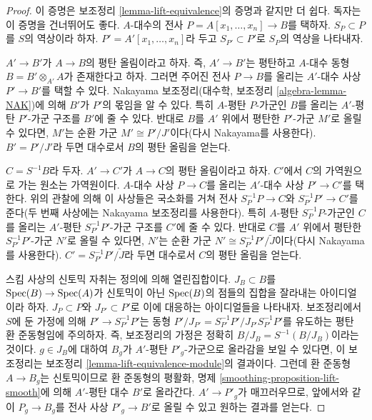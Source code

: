 \begin{proof}
이 증명은 보조정리 \ref{lemma-lift-equivalence}의 증명과 같지만 더 쉽다.
독자는 이 증명을 건너뛰어도 좋다. $A$-대수의 전사
$P = A[x_1, \ldots, x_n] \to B$를 택하자. $S_P \subset P$를 $S$의
역상이라 하자. $P' = A'[x_1, \ldots, x_n]$라 두고
$S_{P'} \subset P'$로 $S_P$의 역상을 나타내자.

\medskip\noindent
$A' \to B'$가 $A \to B$의 평탄 올림이라고 하자. 즉,
$A' \to B'$는 평탄하고 $A$-대수 동형 $B = B' \otimes_{A'} A$가
존재한다고 하자. 그러면 주어진 전사 $P \to B$를 올리는 $A'$-대수
사상 $P' \to B'$를 택할 수 있다. Nakayama 보조정리(대수학, 보조정리
\ref{algebra-lemma-NAK})에 의해 $B'$가 $P'$의 몫임을 알 수 있다.
특히 $A$-평탄 $P$-가군인 $B$를 올리는 $A'$-평탄 $P'$-가군 구조를
$B'$에 줄 수 있다. 반대로 $B$를 $A'$ 위에서 평탄한 $P'$-가군 $M'$로
올릴 수 있다면, $M'$는 순환 가군 $M' \cong P'/J'$이다(다시 Nakayama를
사용한다). $B' = P'/J'$라 두면 대수로서 $B$의 평탄 올림을 얻는다.

\medskip\noindent
$C = S^{-1}B$라 두자. $A' \to C'$가 $A \to C$의 평탄 올림이라고 하자.
$C'$에서 $C$의 가역원으로 가는 원소는 가역원이다. $A$-대수 사상
$P \to C$를 올리는 $A'$-대수 사상 $P' \to C'$를 택한다. 위의 관찰에
의해 이 사상들은 국소화를 거쳐 전사 $S_P^{-1}P \to C$와
$S_{P'}^{-1}P' \to C'$를 준다(두 번째 사상에는 Nakayama 보조정리를
사용한다). 특히 $A$-평탄 $S_P^{-1}P$-가군인 $C$를 올리는 $A'$-평탄
$S_{P'}^{-1}P'$-가군 구조를 $C'$에 줄 수 있다. 반대로 $C$를 $A'$ 위에서
평탄한 $S_{P'}^{-1}P'$-가군 $N'$로 올릴 수 있다면, $N'$는 순환 가군
$N' \cong S_{P'}^{-1}P'/\tilde J$이다(다시 Nakayama를 사용한다).
$C' = S_{P'}^{-1}P'/\tilde J$라 두면 대수로서 $C$의 평탄 올림을 얻는다.

\medskip\noindent
스킴 사상의 신토믹 자취는 정의에 의해 열린집합이다.
$J_B \subset B$를 $\mathop{\mathrm{Spec}}(B) \to \mathop{\mathrm{Spec}}(A)$가 신토믹이 아닌
$\mathop{\mathrm{Spec}}(B)$의 점들의 집합을 잘라내는 아이디얼이라 하자.
$J_P \subset P$와 $J_{P'} \subset P'$로 이에 대응하는 아이디얼들을
나타내자. 보조정리에서 $S$에 둔 가정에 의해
$P' \to S_{P'}^{-1}P'$는 동형
$P'/J_{P'} = S_{P'}^{-1}P'/J_{P'}S_{P'}^{-1}P'$를 유도하는 평탄 환
준동형임에 주의하자. 즉, 보조정리의 가정은 정확히
$B/J_B = S^{-1}(B/J_B)$이라는 것이다. $g \in J_B$에 대하여 $B_g$가
$A'$-평탄 $P'_g$-가군으로 올라감을 보일 수 있다면, 이 보조정리는
보조정리 \ref{lemma-lift-equivalence-module}의 결과이다.%
그런데 환 준동형 $A \to B_g$는 신토믹이므로 환 준동형의 평활화, 명제
\ref{smoothing-proposition-lift-smooth}에 의해 $A'$-평탄 대수 $B'$로
올라간다. $A' \to P'_g$가 매끄러우므로, 앞에서와 같이
$P_g \to B_g$를 전사 사상 $P'_g \to B'$로 올릴 수 있고 원하는 결과를
얻는다.
\end{proof}

